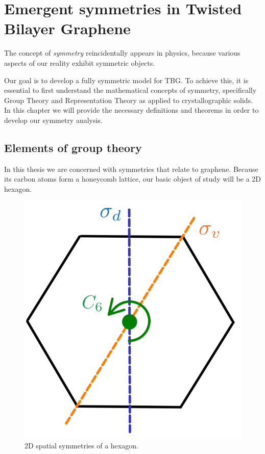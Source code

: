 



\chapter{Emergent symmetries in Twisted Bilayer Graphene}

The concept of \textit{symmetry} reincidentally appears in physics, because various aspects of our reality exhibit symmetric objects.

Our goal is to develop a fully symmetric model for TBG. To achieve this, it is essential to first understand the mathematical concepts of symmetry, specifically Group Theory and Representation Theory as applied to crystallographic solids. In this chapter we will provide the necessary definitions and theorems in order to develop our symmetry analysis.

\section{Elements of group theory}


In this thesis we are concerned with symmetries that relate to graphene. Because its carbon atoms form a honeycomb lattice, our basic object of study will be a 2D hexagon.

\begin{figure}[H]
\centering
\includegraphics[width=0.4\linewidth]{fig/hexagon.png}
\caption{2D spatial symmetries of a hexagon.}
\label{fig:hexagon}
\end{figure}

